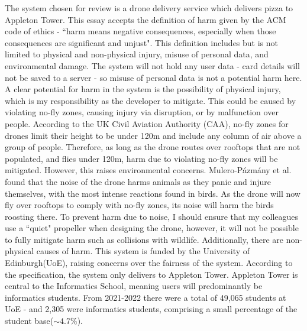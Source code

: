 \documentclass{article}
\begin{document}
The system chosen for review is a drone delivery service which delivers pizza to Appleton Tower. 
This essay accepts the definition of harm given by the ACM code of ethics - ``harm means negative consequences, especially when those consequences are significant and unjust"\supercite{ACM-ethics}. 
This definition includes but is not limited to physical and non-physical injury, misuse of personal data, and environmental damage. 
The system will not hold any user data - card details will not be saved to a server - so misuse of personal data is not a potential harm here.
\newline 
\newline 
A clear potential for harm in the system is the possibility of physical injury, which is my responsibility as the developer to mitigate.
This could be caused by violating no-fly zones, causing injury via disruption\supercite{guardian2018airportdrone}, or by malfunction over people\supercite{drone-harm}. 
According to the UK Civil Aviation Authority (CAA), no-fly zones for drones limit their height to be under 120m and include any column of air above a group of people\supercite{CAA-drone-code}.  
Therefore, as long as the drone routes over rooftops that are not populated, and flies under 120m, harm due to violating no-fly zones will be mitigated. 
However, this raises environmental concerns.
Mulero-Pázmány et al.\supercite{drone-wildlife-review} found that the noise of the drone harms animals as they panic and injure themselves, with the most intense reactions found in birds. 
As the drone will now fly over rooftops to comply with no-fly zones, its noise will harm the birds roosting there. 
To prevent harm due to noise, I should ensure that my colleagues use a ``quiet" propeller\supercite{toroidal-props} when designing the drone, however, it will not be possible to fully mitigate harm such as collisions with wildlife. 
\newline 
\newline 
Additionally, there are non-physical causes of harm. 
This system is funded by the University of Edinburgh(UoE), raising concerns over the fairness of the system. 
According to the specification, the system only delivers to Appleton Tower\supercite{pizza-dronz-spec}.
Appleton Tower is central to the Informatics School\supercite{Appleton-Tower-History}, meaning users will predominantly be informatics students. 
From 2021-2022 there were a total of 49,065 students at UoE - and 2,305 were informatics students\supercite{UoE-stats}, comprising a small percentage of the student base($\sim4.7\%$). 
\end{document}
